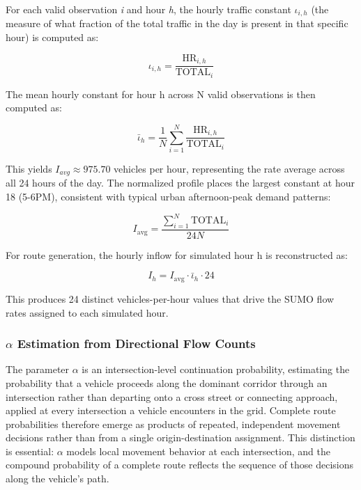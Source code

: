 \documentclass[12pt]{article}
\begin{document}
For each valid observation \emph{i} and hour \emph{h}, the hourly traffic constant $\iota_{i,h}$ (the measure of what fraction of the total traffic in the day is present in that specific hour) is computed as:

\begin{equation}
\label{eq:traffic_constant}
    \iota_{i,h} = \frac{\text{HR}_{i,h}}{\text{TOTAL}_i}
\end{equation}


The mean hourly constant for hour h across N valid observations is then computed as:

\begin{equation}
\label{eq:traffic_constant_mean}
    \bar{\iota}_h = \frac{1}{N}\sum_{i=1}^{N} \frac{\text{HR}_{i,h}}{\text{TOTAL}_i}
\end{equation}



This yields $I_{avg} \approx 975.70$ vehicles per hour, representing the rate average across all 24 hours of the day. The normalized profile places the largest constant at hour 18 (5-6PM), consistent with typical urban afternoon-peak demand patterns:

\begin{equation}
\label{eq:I_avg}
    I_{\text{avg}} = \frac{\sum_{i=1}^{N} \text{TOTAL}_i}{24N}
\end{equation}



For route generation, the hourly inflow for simulated hour h is reconstructed as:

\begin{equation}
\label{eq:I_h}
    I_h = I_{\text{avg}} \cdot \bar{\iota}_h \cdot 24
\end{equation}



This produces 24 distinct vehicles-per-hour values that drive the SUMO flow rates assigned to each simulated hour.

\subsubsection{$\alpha$ Estimation from Directional Flow Counts}

The parameter $\alpha$ is an intersection-level continuation probability, estimating the probability that a vehicle proceeds along the dominant corridor through an intersection rather than departing onto a cross street or connecting approach, applied at every intersection a vehicle encounters in the grid. Complete route probabilities therefore emerge as products of repeated, independent movement decisions rather than from a single origin-destination assignment. This distinction is essential: $\alpha$ models local movement behavior at each intersection, and the compound probability of a complete route reflects the sequence of those decisions along the vehicle's path.
\end{document}
